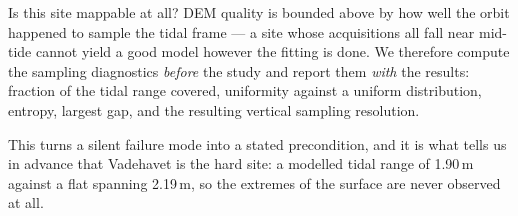 \begin{pblock}{Is this site mappable at all?}
DEM quality is bounded above by how well the orbit happened to sample the
tidal frame — a site whose acquisitions all fall near mid-tide cannot yield a
good model however the fitting is done. We therefore compute the sampling
diagnostics \emph{before} the study and report them \emph{with} the results:
fraction of the tidal range covered, uniformity against a uniform
distribution, entropy, largest gap, and the resulting vertical sampling
resolution.

This turns a silent failure mode into a stated precondition, and it is what
tells us in advance that Vadehavet is the hard site: a modelled tidal range of
1.90\,m against a flat spanning 2.19\,m, so the extremes of
the surface are never observed at all.
\end{pblock}

